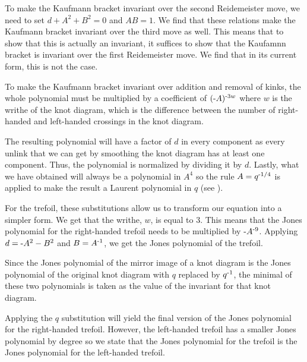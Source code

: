 \begin{paper}

To make the Kaufmann bracket invariant over the second Reidemeister move, we
need to set $d+A^2+B^2=0$ and $AB=1$.
We find that these relations make the Kaufmann bracket invariant over the third
move as well.
This means that to show that this is actually an invariant, it suffices to show
that the Kaufamnn bracket is invariant over the first Reidemeister move.
We find that in its current form, this is not the case.


To make the Kaufmann bracket invariant over addition and removal of kinks, the
whole polynomial must be multiplied by a coefficient of $(\text-A)^{\text-3w}$
where $w$ is the writhe of the knot diagram, which is the difference between the
number of right-handed and left-handed crossings in the knot diagram.


The resulting polynomial will have a factor of $d$ in every component as every
unlink that we can get by smoothing the knot diagram has at least one component.
Thus, the polynomial is normalized by dividing it by $d$.
Lastly, what we have obtained will always be a polynomial in $A^4$ so the rule
$A=q^{\text-1/4}$ is applied to make the result a Laurent polynomial in $q$
(see \cite{new}).

For the trefoil, these substitutions allow us to transform our equation into a
simpler form.
We get that the writhe, $w$, is equal to 3.
This means that the Jones polynomial for the right-handed trefoil needs to be
multiplied by $\text-A^{\text-9}$.
Applying $d=\text-A^2-B^2$ and $B=A^{\text-1}$, we get the Jones polynomial of
the trefoil.


Since the Jones polynomial of the mirror image of a knot diagram is the Jones
polynomial of the original knot diagram with $q$ replaced by $q^{\text-1}$, the
minimal of these two polynomials is taken as the value of the invariant for that
knot diagram.

Applying the $q$ substitution will yield the final version of the Jones
polynomial for the right-handed trefoil.
However, the left-handed trefoil has a smaller Jones polynomial by degree so we
state that the Jones polynomial for the trefoil is the Jones polynomial for the
left-handed trefoil.


\end{paper}
